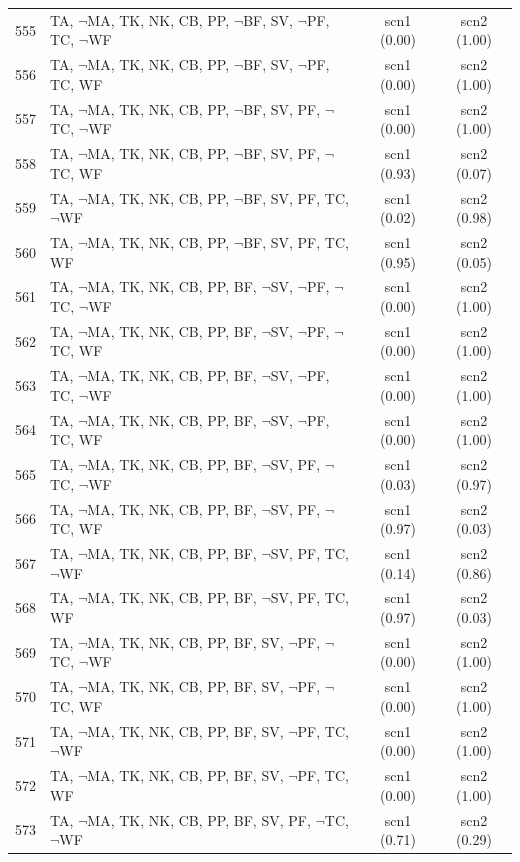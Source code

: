 \documentclass[12pt]{article}
\begin{document}
\begin{longtable}{|l|l|c|c|}
555 & TA, $\neg$MA, TK, NK, CB, PP, $\neg$BF, SV, $\neg$PF, TC, $\neg$WF & scn1 (0.00) & scn2 (1.00)\\
556 & TA, $\neg$MA, TK, NK, CB, PP, $\neg$BF, SV, $\neg$PF, TC, WF & scn1 (0.00) & scn2 (1.00)\\
557 & TA, $\neg$MA, TK, NK, CB, PP, $\neg$BF, SV, PF, $\neg$TC, $\neg$WF & scn1 (0.00) & scn2 (1.00)\\
558 & TA, $\neg$MA, TK, NK, CB, PP, $\neg$BF, SV, PF, $\neg$TC, WF & scn1 (0.93) & scn2 (0.07)\\
559 & TA, $\neg$MA, TK, NK, CB, PP, $\neg$BF, SV, PF, TC, $\neg$WF & scn1 (0.02) & scn2 (0.98)\\
560 & TA, $\neg$MA, TK, NK, CB, PP, $\neg$BF, SV, PF, TC, WF & scn1 (0.95) & scn2 (0.05)\\
561 & TA, $\neg$MA, TK, NK, CB, PP, BF, $\neg$SV, $\neg$PF, $\neg$TC, $\neg$WF & scn1 (0.00) & scn2 (1.00)\\
562 & TA, $\neg$MA, TK, NK, CB, PP, BF, $\neg$SV, $\neg$PF, $\neg$TC, WF & scn1 (0.00) & scn2 (1.00)\\
563 & TA, $\neg$MA, TK, NK, CB, PP, BF, $\neg$SV, $\neg$PF, TC, $\neg$WF & scn1 (0.00) & scn2 (1.00)\\
564 & TA, $\neg$MA, TK, NK, CB, PP, BF, $\neg$SV, $\neg$PF, TC, WF & scn1 (0.00) & scn2 (1.00)\\
565 & TA, $\neg$MA, TK, NK, CB, PP, BF, $\neg$SV, PF, $\neg$TC, $\neg$WF & scn1 (0.03) & scn2 (0.97)\\
566 & TA, $\neg$MA, TK, NK, CB, PP, BF, $\neg$SV, PF, $\neg$TC, WF & scn1 (0.97) & scn2 (0.03)\\
567 & TA, $\neg$MA, TK, NK, CB, PP, BF, $\neg$SV, PF, TC, $\neg$WF & scn1 (0.14) & scn2 (0.86)\\
568 & TA, $\neg$MA, TK, NK, CB, PP, BF, $\neg$SV, PF, TC, WF & scn1 (0.97) & scn2 (0.03)\\
569 & TA, $\neg$MA, TK, NK, CB, PP, BF, SV, $\neg$PF, $\neg$TC, $\neg$WF & scn1 (0.00) & scn2 (1.00)\\
570 & TA, $\neg$MA, TK, NK, CB, PP, BF, SV, $\neg$PF, $\neg$TC, WF & scn1 (0.00) & scn2 (1.00)\\
571 & TA, $\neg$MA, TK, NK, CB, PP, BF, SV, $\neg$PF, TC, $\neg$WF & scn1 (0.00) & scn2 (1.00)\\
572 & TA, $\neg$MA, TK, NK, CB, PP, BF, SV, $\neg$PF, TC, WF & scn1 (0.00) & scn2 (1.00)\\
573 & TA, $\neg$MA, TK, NK, CB, PP, BF, SV, PF, $\neg$TC, $\neg$WF & scn1 (0.71) & scn2 (0.29)\\

\end{longtable}
\end{document}
